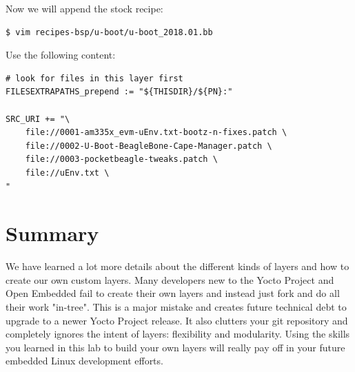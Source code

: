 \documentclass[a4paper,12pt,obeyspaces,spaces,hyphens]{article}
\newcommand{\code}[1]
{\path{#1}}
\begin{document}
Now we will append the stock \code{u-boot} recipe:
\begin{verbatim}
$ vim recipes-bsp/u-boot/u-boot_2018.01.bb
\end{verbatim}

Use the following content:
\begin{tcolorbox}[enhanced jigsaw,colback=bg,boxrule=0pt,arc=0pt]
\begin{verbatim}
# look for files in this layer first
FILESEXTRAPATHS_prepend := "${THISDIR}/${PN}:"

SRC_URI += "\
    file://0001-am335x_evm-uEnv.txt-bootz-n-fixes.patch \
    file://0002-U-Boot-BeagleBone-Cape-Manager.patch \
    file://0003-pocketbeagle-tweaks.patch \
    file://uEnv.txt \
"
\end{verbatim}
\end{tcolorbox}

\section{Summary}
We have learned a lot more details about the different kinds of layers and how to create our own custom layers. Many developers new to the Yocto Project and Open Embedded fail to create their own layers and instead just fork \code{poky} and do all their work "in-tree". This is a major mistake and creates future technical debt to upgrade to a newer Yocto Project release. It also clutters your git repository and completely ignores the intent of layers: flexibility and modularity. Using the skills you learned in this lab to build your own layers will really pay off in your future embedded Linux development efforts.
\end{document}
